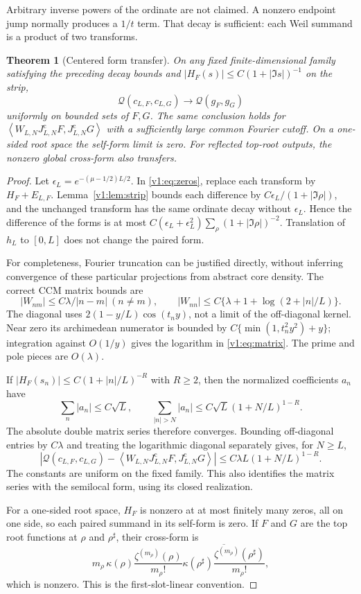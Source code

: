 \documentclass[11pt]{article}
\newtheorem{theorem}{Theorem}[section]
\theoremstyle{remark}
\newcommand{\ip}[2]{\left\langle #1,#2\right\rangle}
\newcommand{\Q}{\mathcal Q}
\newcommand{\Jc}{J^{\mathrm c}}
\begin{document}
Arbitrary inverse powers of the ordinate are not claimed. A nonzero
endpoint jump normally produces a $1/t$ term. That decay is sufficient:
each Weil summand is a product of two transforms.

\begin{theorem}[Centered form transfer]\label{v1:thm:center}
On any fixed finite-dimensional family satisfying the preceding decay
bounds and $|H_F(s)|\le C(1+|\Im s|)^{-1}$ on the strip,
\[
 \Q(c_{L,F},c_{L,G})\longrightarrow\Q(g_F,g_G)
\]
uniformly on bounded sets of $F,G$. The same conclusion holds for
$\ip{W_{L,N}\Jc_{L,N}F}{\Jc_{L,N}G}$ with a sufficiently large common
Fourier cutoff. On a one-sided root space the self-form limit is zero.
For reflected top-root outputs, the nonzero global cross-form also transfers.
\end{theorem}
\begin{proof}
Let $\epsilon_L=e^{-(\mu-1/2)L/2}$. In \eqref{v1:eq:zeros}, replace
each transform by $H_F+E_{L,F}$. Lemma~\ref{v1:lem:strip} bounds each difference
by $C\epsilon_L/(1+|\Im\rho|)$, and the unchanged transform has the same
ordinate decay without $\epsilon_L$. Hence the difference of the forms is
at most
$C(\epsilon_L+\epsilon_L^2)\sum_\rho(1+|\Im\rho|)^{-2}$.
Translation of $h_L$ to $[0,L]$ does not change the paired form.

For completeness, Fourier truncation can be justified directly, without
inferring convergence of these particular projections from abstract core
density. The correct CCM matrix bounds are
\begin{equation}\label{v1:eq:matrix}
 |W_{nm}|\le C\lambda/|n-m|\ (n\ne m),\qquad
 |W_{nn}|\le C\{\lambda+1+\log(2+|n|/L)\}.
\end{equation}
The diagonal uses $2(1-y/L)\cos(t_ny)$, not a limit of the off-diagonal
kernel. Near zero its archimedean numerator is bounded by
$C\{\min(1,t_n^2y^2)+y\}$; integration against $O(1/y)$ gives the
logarithm in \eqref{v1:eq:matrix}. The prime and pole pieces are $O(\lambda)$.

If $|H_F(s_n)|\le C(1+|n|/L)^{-R}$ with $R\ge2$, then the normalized
coefficients $a_n$ have
\[
 \sum_n|a_n|\le C\sqrt L,\qquad
 \sum_{|n|>N}|a_n|\le C\sqrt L(1+N/L)^{1-R}.
\]
The absolute double matrix series therefore converges. Bounding off-diagonal
entries by $C\lambda$ and treating the logarithmic diagonal separately gives,
for $N\ge L$,
\begin{equation}\label{v1:eq:galerkin}
 |\Q(c_{L,F},c_{L,G})-
 \ip{W_{L,N}\Jc_{L,N}F}{\Jc_{L,N}G}|
 \le C\lambda L(1+N/L)^{1-R}.
\end{equation}
The constants are uniform on the fixed family. This also identifies the
matrix series with the semilocal form, using its closed realization.

For a one-sided root space, $H_F$ is nonzero at at most finitely many zeros,
all on one side, so each paired summand in its self-form is zero. If $F$ and
$G$ are the top root functions at $\rho$ and $\rho^\sharp$, their cross-form is
\[
 m_\rho\,\kappa(\rho)\frac{\zeta^{(m_\rho)}(\rho)}{m_\rho!}
 \overline{\kappa(\rho^\sharp)
 \frac{\zeta^{(m_\rho)}(\rho^\sharp)}{m_\rho!}},
\]
which is nonzero. This is the first-slot-linear convention.
\end{proof}
\end{document}
